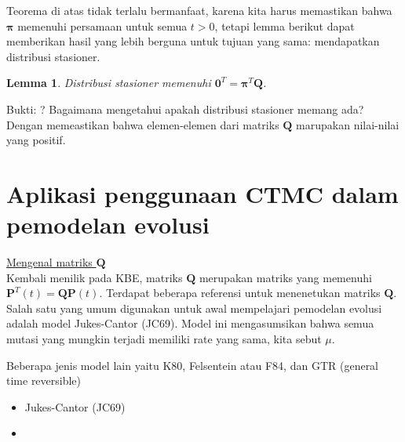 \documentclass[11pt,b5paper,twoside]{book}
\newcommand{\bP}{\boldsymbol{P}}
\newcommand{\bQ}{\boldsymbol{Q}}
\newtheorem{lemma}[section]{Lemma}
\begin{document}
	
	Teorema di atas tidak terlalu bermanfaat, karena kita harus memastikan bahwa  $\boldsymbol{\pi}$ memenuhi persamaan untuk semua $t >0 $, tetapi lemma berikut dapat memberikan hasil yang lebih berguna untuk tujuan yang sama: mendapatkan distribusi stasioner.
	
	\begin{lemma}
		Distribusi stasioner memenuhi $\boldsymbol{0}^T  = \boldsymbol{\pi}^T \bQ$.
	\end{lemma}	

	\noindent Bukti: ?
	Bagaimana mengetahui apakah distribusi stasioner memang ada? Dengan memeastikan bahwa elemen-elemen dari matriks $\bQ$ marupakan nilai-nilai yang positif.
	
	\section{Aplikasi penggunaan CTMC dalam pemodelan evolusi} %
	\underline{Mengenal matriks $\bQ$}\\
	
	
	\noindent Kembali menilik pada KBE, matriks $\bQ$ merupakan matriks yang memenuhi $\bP^T (t) = \bQ \bP(t)$.
	Terdapat beberapa referensi untuk menenetukan matriks $\bQ$. Salah satu yang umum digunakan untuk awal mempelajari pemodelan evolusi adalah model Jukes-Cantor (JC69). Model ini mengasumsikan bahwa semua mutasi yang mungkin terjadi memiliki rate yang sama, kita sebut $\mu$. 
	
	\noindent Beberapa jenis model lain yaitu K80, Felsentein atau F84, dan GTR (general time reversible)
	\begin{itemize}
		\item Jukes-Cantor (JC69)
		
		\item 
	\end{itemize}
	
\end{document}
